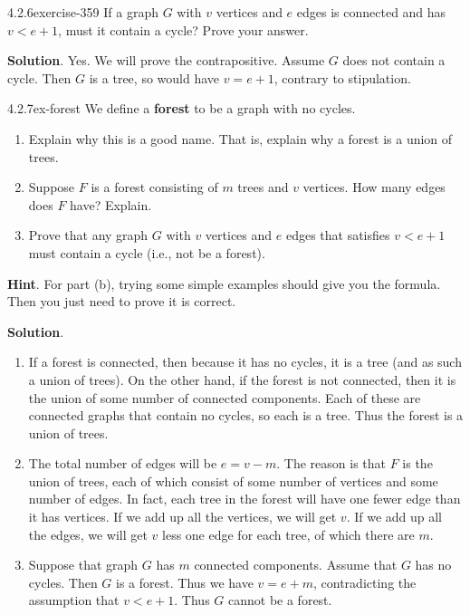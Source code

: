 \documentclass[twoside,11pt,]{book}
\newcommand{\terminology}[1]{\textbf{#1}}
\numberwithin{equation}{chapter}
\newcommand{\lt}{<}
\begin{document}
\begin{divisionsolution}{4.2.6}{}{exercise-359}%
\hypertarget{p-4588}{}%
If a graph \(G\) with \(v\) vertices and \(e\) edges is connected and has \(v \lt e+1\), must it contain a cycle? Prove your answer.%
\par\smallskip%
\noindent\textbf{Solution}.\quad%
\hypertarget{p-4589}{}%
Yes. We will prove the contrapositive. Assume \(G\) does not contain a cycle. Then \(G\) is a tree, so would have \(v = e+1\), contrary to stipulation.%
\end{divisionsolution}%
\begin{divisionsolution}{4.2.7}{}{ex-forest}%
\hypertarget{p-4590}{}%
We define a \terminology{forest} to be a graph with no cycles.\leavevmode%
\begin{enumerate}[label=(\alph*)]
\item\hypertarget{li-2276}{}\hypertarget{p-4591}{}%
Explain why this is a good name. That is, explain why a forest is a union of trees.%
\item\hypertarget{li-2277}{}\hypertarget{p-4592}{}%
Suppose \(F\) is a forest consisting of \(m\) trees and \(v\) vertices. How many edges does \(F\) have? Explain.%
\item\hypertarget{li-2278}{}\hypertarget{p-4593}{}%
Prove that any graph \(G\) with \(v\) vertices and \(e\) edges that satisfies \(v \lt e+1\) must contain a cycle (i.e., not be a forest).%
\end{enumerate}
%
\par\smallskip%
\noindent\textbf{Hint}.\quad%
\hypertarget{p-4594}{}%
For part (b), trying some simple examples should give you the formula.  Then you just need to prove it is correct.%
\par\smallskip%
\noindent\textbf{Solution}.\quad%
\hypertarget{p-4595}{}%
\leavevmode%
\begin{enumerate}[label=(\alph*)]
\item\hypertarget{li-2279}{}\hypertarget{p-4596}{}%
If a forest is connected, then because it has no cycles, it is a tree (and as such a union of trees). On the other hand, if the forest is not connected, then it is the union of some number of connected components. Each of these are connected graphs that contain no cycles, so each is a tree. Thus the forest is a union of trees.%
\item\hypertarget{li-2280}{}\hypertarget{p-4597}{}%
The total number of edges will be \(e = v - m\). The reason is that \(F\) is the union of trees, each of which consist of some number of vertices and some number of edges. In fact, each tree in the forest will have one fewer edge than it has vertices. If we add up all the vertices, we will get \(v\). If we add up all the edges, we will get \(v\) less one edge for each tree, of which there are \(m\).%
\item\hypertarget{li-2281}{}\hypertarget{p-4598}{}%
Suppose that graph \(G\) has \(m\) connected components. Assume that \(G\) has no cycles. Then \(G\) is a forest. Thus we have \(v = e+m\), contradicting the assumption that \(v \lt e+1\). Thus \(G\) cannot be a forest.%
\end{enumerate}
%
\end{divisionsolution}%
\end{document}
